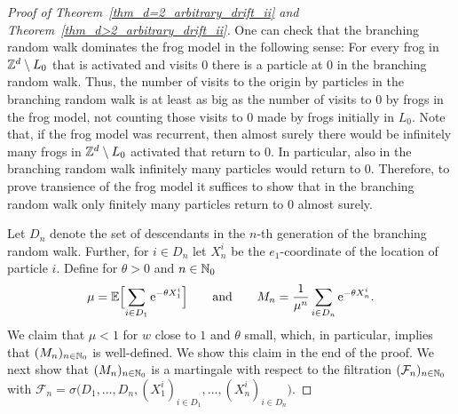 \begin{proof}[Proof of Theorem~\ref{thm_d=2_arbitrary_drift_ii} and Theorem~\ref{thm_d>2_arbitrary_drift_ii}]
One can check that the branching random walk dominates the frog model in the following sense: 
For every frog in $\mathbb{Z}^d \setminus L_0$ that is activated and visits $0$ there is a particle at $0$ in the branching random walk. Thus, the number of visits to the origin by particles in the branching random walk is at least as big as the number of visits to $0$ by frogs in the frog model, not counting those visits to $0$ made by frogs initially in $L_0$. 
Note that, if the frog model was recurrent, then almost surely there would be infinitely many frogs in $\mathbb{Z}^d \setminus L_0$ activated that return to $0$. In particular, also in the branching random walk infinitely many particles would return to $0$. Therefore, to prove transience of the frog model it suffices to show that in the branching random walk only finitely many particles return to $0$ almost surely.

Let $D_n$ denote the set of descendants in the $n$-th generation of the branching random walk. Further, for $i \in D_n$ let $X_n^i$ be the $e_1$-coordinate of the location of particle $i$. Define for $\theta >0$ and $n \in \mathbb{N}_0$
\begin{equation}
 \mu = \mathbb{E} \Bigl[ \sum_{i \in D_1} \mathrm{e}^{-\theta  X_1^i} \Bigr] \qquad \text{and}  \qquad  M_n = \frac{1}{\mu^n} \sum_{i \in D_n} \mathrm{e}^{-\theta X_n^i}.
\end{equation}
We claim that $\mu <1$ for $w$ close to $1$ and $\theta$ small, which, in particular, implies that $(M_n)_{n \in \mathbb{N}_0}$ is well-defined. We show this claim in the end of the proof. We next show that $(M_n)_{n \in \mathbb{N}_0}$ is a martingale with respect to the filtration $(\mathcal{F}_n)_{n \in \mathbb{N}_0}$ with $\mathcal{F}_n=\sigma \bigl(D_1, \ldots, D_{n}, (X^i_1)_{i \in D_1}, \ldots, (X^i_{n})_{i \in D_{n}} \bigr)$.


\end{proof}
